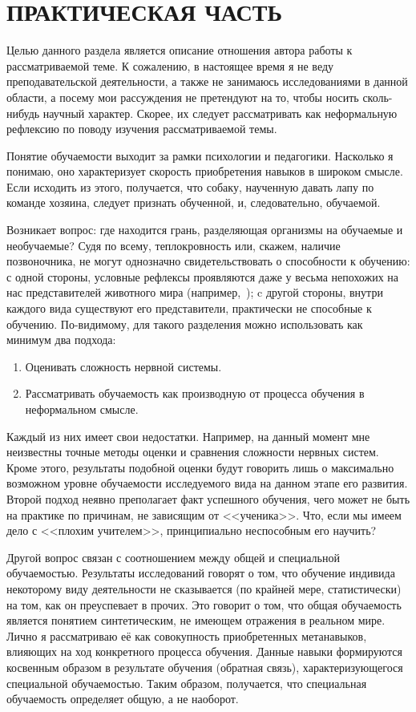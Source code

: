 \section[Практическая часть]{ПРАКТИЧЕСКАЯ ЧАСТЬ}

Целью данного раздела является описание отношения автора работы
к рассматриваемой теме. К сожалению, в настоящее время я не веду
преподавательской деятельности, а также не занимаюсь исследованиями
в данной области, а посему мои рассуждения не претендуют на то,
чтобы носить сколь-нибудь научный характер.
Скорее, их следует рассматривать как
неформальную рефлексию по поводу изучения рассматриваемой темы.

Понятие обучаемости выходит за рамки психологии и педагогики.
Насколько я понимаю, оно характеризует скорость приобретения навыков в широком смысле.
Если исходить из этого, получается, что собаку, наученную давать лапу по команде хозяина,
следует признать обученной, и, следовательно, обучаемой.

Возникает вопрос: где находится грань, разделяющая организмы на обучаемые и необучаемые?
Судя по всему, теплокровность или, скажем, наличие позвоночника,
не могут однозначно свидетельствовать о способности к обучению:
с одной стороны, условные рефлексы проявляются даже у весьма непохожих на нас
представителей животного мира (например,~\cite{tarakany});
c другой стороны, внутри каждого вида существуют его представители,
практически не способные к обучению.
По-видимому, для такого разделения можно использовать как минимум два подхода:
\begin{enumerate}
\item Оценивать сложность нервной системы.
\item Рассматривать обучаемость как производную от процесса обучения в неформальном смысле.
\end{enumerate}

Каждый из них имеет свои недостатки.
Например, на данный момент мне неизвестны точные методы оценки и
сравнения сложности нервных систем.
Кроме этого, результаты подобной оценки будут говорить лишь о максимально возможном
уровне обучаемости исследуемого вида на данном этапе его развития.
Второй подход неявно преполагает факт успешного обучения,
чего может не быть на практике по причинам, не зависящим от <<ученика>>.
Что, если мы имеем дело с <<плохим учителем>>, принципиально неспособным его научить?

Другой вопрос связан с соотношением между общей и специальной обучаемостью.
Результаты исследований говорят о том, что обучение индивида некоторому виду деятельности
не сказывается (по крайней мере, статистически) на том, как он преуспевает в прочих.
Это говорит о том, что общая обучаемость является понятием синтетическим,
не имеющем отражения в реальном мире.
Лично я рассматриваю её как совокупность приобретенных метанавыков,
влияющих на ход конкретного процесса обучения.
Данные навыки формируются косвенным образом в результате обучения
(обратная связь), характеризующегося специальной обучаемостью.
Таким образом, получается, что специальная обучаемость определяет общую, а не наоборот.

